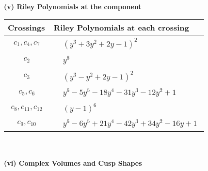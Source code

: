 \documentclass[1p]{elsarticle_modified}
\theoremstyle{definition}
\begin{document}
\newpage\renewcommand{\arraystretch}{1}
\flushleft \textbf{(v) Riley Polynomials at the component}\newline \\
\begin{tabular}{m{50pt}|m{274pt}}
Crossings & \hspace{64pt}Riley Polynomials at each crossing \\
\hline $$\begin{aligned}c_{1},c_{4},c_{7}\end{aligned}$$&$\begin{aligned}
&(y^3+3 y^2+2 y-1)^2
\end{aligned}$\\
\hline $$\begin{aligned}c_{2}\end{aligned}$$&$\begin{aligned}
&y^6
\end{aligned}$\\
\hline $$\begin{aligned}c_{3}\end{aligned}$$&$\begin{aligned}
&(y^3- y^2+2 y-1)^2
\end{aligned}$\\
\hline $$\begin{aligned}c_{5},c_{6}\end{aligned}$$&$\begin{aligned}
&y^6-5 y^5-18 y^4-31 y^3-12 y^2+1
\end{aligned}$\\
\hline $$\begin{aligned}c_{8},c_{11},c_{12}\end{aligned}$$&$\begin{aligned}
&(y-1)^6
\end{aligned}$\\
\hline $$\begin{aligned}c_{9},c_{10}\end{aligned}$$&$\begin{aligned}
&y^6-6 y^5+21 y^4-42 y^3+34 y^2-16 y+1
\end{aligned}$\\
\hline
\end{tabular}\\~\\
\newpage\flushleft \textbf{(vi) Complex Volumes and Cusp Shapes}
\end{document}
